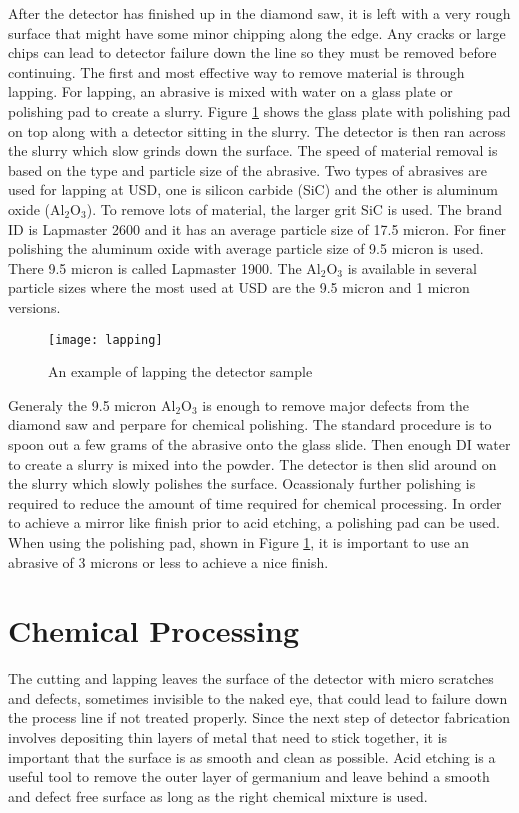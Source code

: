 After the detector has finished up in the diamond saw, it is left with a very rough surface that might have some minor chipping along the edge.
Any cracks or large chips can lead to detector failure down the line so they must be removed before continuing.
The first and most effective way to remove material is through lapping.
For lapping, an abrasive is mixed with water on a glass plate or polishing pad to create a slurry.
Figure \ref{fig:lapping} shows the glass plate with polishing pad on top along with a detector sitting in the slurry.
The detector is then ran across the slurry which slow grinds down the surface.
The speed of material removal is based on the type and particle size of the abrasive.
Two types of abrasives are used for lapping at USD, one is silicon carbide (SiC) and the other is aluminum oxide (Al$_2$O$_3$).
To remove lots of material, the larger grit SiC is used.
The brand ID is Lapmaster 2600 and it has an average particle size of 17.5 micron.
For finer polishing the aluminum oxide with average particle size of 9.5 micron is used.
There 9.5 micron is called Lapmaster 1900.
The Al$_2$O$_3$ is available in several particle sizes where the most used at USD are the 9.5 micron and 1 micron versions.
\begin{figure}[htpb]
\centering
\texttt{[image: lapping]}
\caption{An example of lapping the detector sample}
\label{fig:lapping}
\end{figure}
Generaly the 9.5 micron Al$_2$O$_3$ is enough to remove major defects from the diamond saw and perpare for chemical polishing.
The standard procedure is to spoon out a few grams of the abrasive onto the glass slide.
Then enough DI water to create a slurry is mixed into the powder.
The detector is then slid around on the slurry which slowly polishes the surface.
Ocassionaly further polishing is required to reduce the amount of time required for chemical processing.
In order to achieve a mirror like finish prior to acid etching, a polishing pad can be used.
When using the polishing pad, shown in Figure \ref{fig:lapping}, it is important to use an abrasive of 3 microns or less to achieve a nice finish.


\section{Chemical Processing}

The cutting and lapping leaves the surface of the detector with micro scratches and defects, sometimes invisible to the naked eye, that could lead to failure down the process line if not treated properly.
Since the next step of detector fabrication involves depositing thin layers of metal that need to stick together, it is important that the surface is as smooth and clean as possible.
Acid etching is a useful tool to remove the outer layer of germanium and leave behind a smooth and defect free surface as long as the right chemical mixture is used.  

